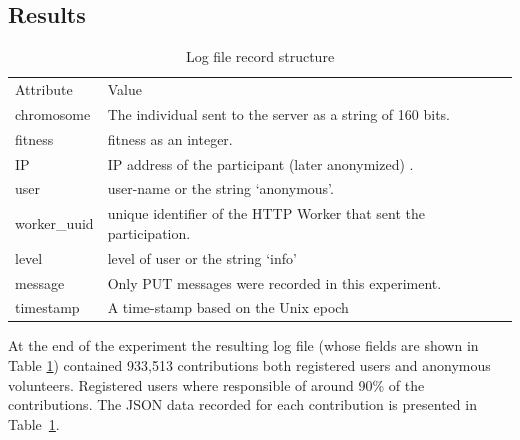 \documentclass{llncs}
\begin{document}
\subsection{Results}
\label{sec:results}

\begin{table}[h!tbp]
  \small
  \caption{ Log file record structure}
  \label{tab:record} 
  \centering
  \small
  \begin{tabular}{l  l}
    \hline\noalign{\smallskip}
    Attribute & Value \\
    \noalign{\smallskip}\hline\noalign{\smallskip}
    chromosome   & The individual sent to the server as a string of 160 bits.  \\ \hline
    fitness & fitness as an integer.  \\ \hline
    IP & IP address of the participant (later anonymized) .\\ \hline
    user & user-name or the string `anonymous'.  \\ \hline
    worker\_uuid & unique identifier of the HTTP Worker that sent the participation.   \\ \hline
    level &  level of user or the string `info' \\ \hline
    message & Only PUT messages were recorded in this experiment. \\ \hline
    timestamp & A time-stamp based on the Unix epoch\\ \hline
  \end{tabular}
\end{table}
%
At the end of the experiment the resulting log file (whose fields are shown in Table \ref{tab:record}) contained 933,513 contributions both 
registered users and anonymous volunteers. Registered users where responsible of around
90\% of the contributions. The JSON data recorded for each contribution is  presented 
in Table~\ref{tab:record}.  
\end{document}
